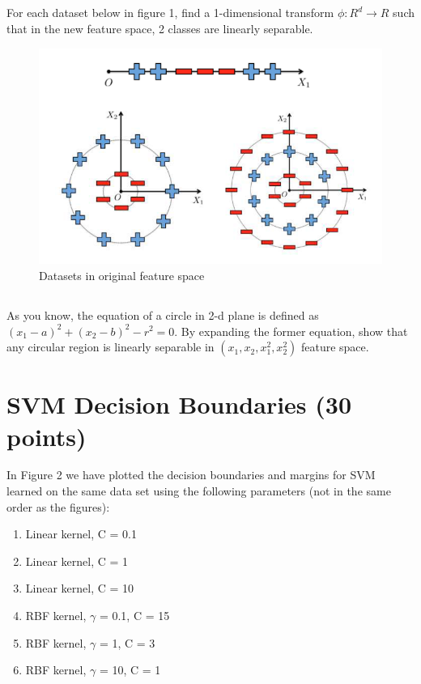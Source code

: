 \documentclass[a4paper]{article}
\begin{document}
	\subsection{}
	For each dataset below in figure 1, find a 1-dimensional transform $\phi: R^d \rightarrow R$ such that in the new feature space, 2 classes are linearly separable.
	\begin{figure}
		[hbt!]
		\centering
		\includegraphics[scale=0.45]{Figure1.png}
		\caption{Datasets in original feature space}
	\end{figure}
	
	\subsection{}
	As you know, the equation of a circle in 2-d plane is defined as $(x_1 - a)^2 + (x_2 - b)^2 - r^2 = 0$. By expanding the former equation, show that any circular region is linearly separable in $(x_1, x_2, x_1^2, x_2^2)$ feature space.
	\bigskip
	
	
	\section{SVM Decision Boundaries (30 points)}
	In Figure 2 we have plotted the decision boundaries and margins for SVM learned on the
	same data set using the following parameters (not in the same order as the figures):

	\begin{enumerate}[label=(\roman*)]
		\item Linear kernel, C = 0.1
		\item Linear kernel, C = 1
		\item Linear kernel, C = 10
		\item RBF kernel, $\gamma$ = 0.1, C = 15
		\item RBF kernel, $\gamma$ = 1, C = 3
		\item RBF kernel, $\gamma$ = 10, C = 1
	\end{enumerate}
	
\end{document}
